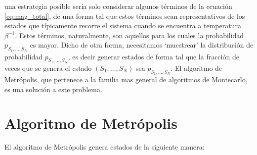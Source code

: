 \documentclass[a4paper,11pt,oneside]{article}
\begin{document}
una estrategia posible sería solo considerar algunos términos de la ecuación
\ref{eq:mag_total}, de una forma tal que estos términos sean representativos
de los estados que típicamente recorre el sistema cuando se encuentra a
temperatura $\beta^{-1}$. Estos términos, naturalmente, son aquellos para los
cuales la probabilidad $p_{S_1,\dots,S_N}$ es mayor.
Dicho de otra forma, necesitamos `muestrear' la
distribución de probabilidad $p_{S_1,\dots,S_N}$, es decir generar estados de
forma tal que la fracción de veces que se genera el estado $(S_1,\dots,S_N)$
sea $p_{S_1,\dots,S_N}$. El algoritmo de Metrópolis, que pertenece a la familia
mas general de algoritmos de Montecarlo, es una solución a este problema.

\section{Algoritmo de Metrópolis}

El algoritmo de Metrópolis genera estados de la siguiente manera:
\end{document}
